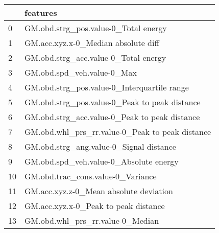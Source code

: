 \begin{tabular}{ll}
\toprule
{} &                                         features \\
\midrule
0  &             GM.obd.strg\_pos.value-0\_Total energy \\
1  &              GM.acc.xyz.x-0\_Median absolute diff \\
2  &             GM.obd.strg\_acc.value-0\_Total energy \\
3  &                       GM.obd.spd\_veh.value-0\_Max \\
4  &      GM.obd.strg\_pos.value-0\_Interquartile range \\
5  &    GM.obd.strg\_pos.value-0\_Peak to peak distance \\
6  &    GM.obd.strg\_acc.value-0\_Peak to peak distance \\
7  &  GM.obd.whl\_prs\_rr.value-0\_Peak to peak distance \\
8  &          GM.obd.strg\_ang.value-0\_Signal distance \\
9  &           GM.obd.spd\_veh.value-0\_Absolute energy \\
10 &                GM.obd.trac\_cons.value-0\_Variance \\
11 &           GM.acc.xyz.z-0\_Mean absolute deviation \\
12 &             GM.acc.xyz.x-0\_Peak to peak distance \\
13 &                 GM.obd.whl\_prs\_rr.value-0\_Median \\
\bottomrule
\end{tabular}
